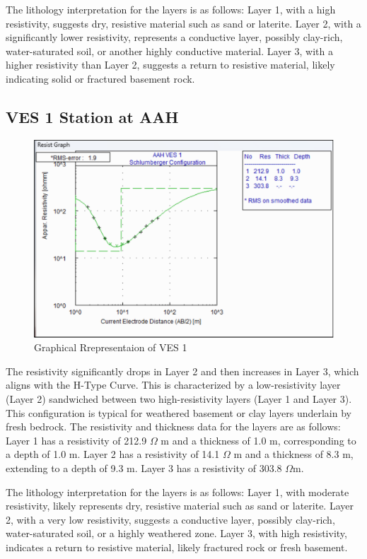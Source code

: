 \documentclass[12pt,a4paper]{report}
\begin{document}
The lithology interpretation for the layers is as follows: Layer 1, with a high resistivity, suggests dry, resistive material such as sand or laterite. Layer 2, with a significantly lower resistivity, represents a conductive layer, possibly clay-rich, water-saturated soil, or another highly conductive material. Layer 3, with a higher resistivity than Layer 2, suggests a return to resistive material, likely indicating solid or fractured basement rock.

\subsection{VES 1 Station at AAH}

\begin{figure}[H]
    \centering
    \includegraphics[width=1.0\textwidth]{aah_ves1.png}
    \caption{Graphical Rrepresentaion of VES 1}
    \label{fig:AAH_VES_1_Curve}
\end{figure}

The resistivity significantly drops in Layer 2 and then increases in Layer 3, which aligns with the H-Type Curve. This is characterized by a low-resistivity layer (Layer 2) sandwiched between two high-resistivity layers (Layer 1 and Layer 3). This configuration is typical for weathered basement or clay layers underlain by fresh bedrock. The resistivity and thickness data for the layers are as follows: Layer 1 has a resistivity of 212.9 $\Omega$ m and a thickness of 1.0 m, corresponding to a depth of 1.0 m. Layer 2 has a resistivity of 14.1 $\Omega$ m and a thickness of 8.3 m, extending to a depth of 9.3 m. Layer 3 has a resistivity of 303.8 $\Omega$m.

The lithology interpretation for the layers is as follows: Layer 1, with moderate resistivity, likely represents dry, resistive material such as sand or laterite. Layer 2, with a very low resistivity, suggests a conductive layer, possibly clay-rich, water-saturated soil, or a highly weathered zone. Layer 3, with high resistivity, indicates a return to resistive material, likely fractured rock or fresh basement.
\end{document}
